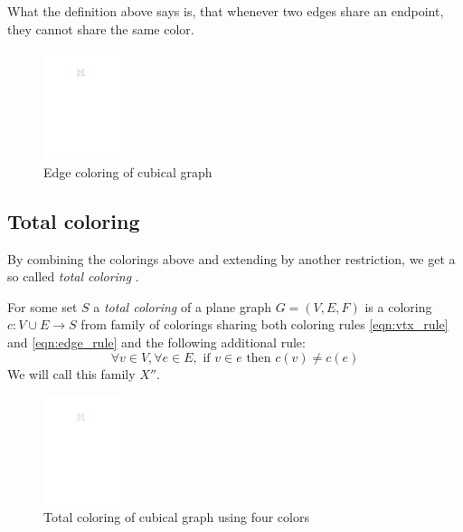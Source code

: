 What the definition above says is, that whenever two edges share an endpoint, they cannot share the same color. 

\begin{figure}[H]
    \centering
    \includegraphics[width=0.2\textwidth]{../Resources/Figs/cubical_edg_colr.pdf}
    \caption{Edge coloring of cubical graph}
    \label{fig:cubical_edge_coloring}
\end{figure}



\subsection{Total coloring}

By combining the colorings above and extending by another restriction, we get a so called \textit{total coloring} \cite{behzad65}.

\begin{defn}
    For some set $S$ a \emph{total coloring} of a plane graph $G=(V,E,F)$ is a coloring $c: V \cup E \rightarrow S$ from family of colorings sharing both coloring rules \ref{eqn:vtx_rule} and \ref{eqn:edge_rule} and the following additional rule: 
    \begin{equation}\label{eqn:tot_rule}
    \forall v \in V,  \forall e \in E, \text{ if } v \in e \text{ then } c(v) \neq c(e) \tag{$R_T$}
    \end{equation}
    We will call this family $X''$.
\end{defn}

\begin{figure}[H]
    \centering
    \includegraphics[width=0.2\textwidth]{../Resources/Figs/cubical_tot_colr_opt.pdf}
    \caption{Total coloring of cubical graph using four colors}
    \label{fig:cubical_tot_coloring}
\end{figure}


